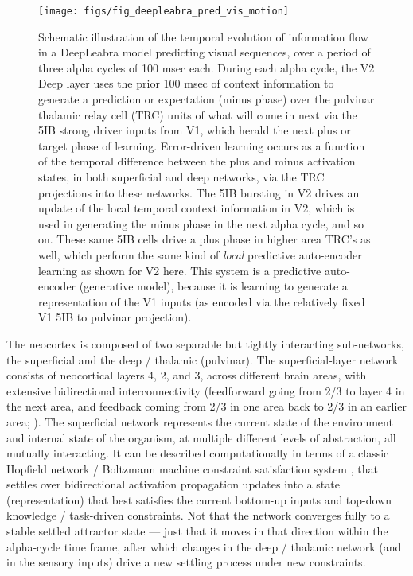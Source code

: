 \documentclass[11pt,twoside]{article}
\newif\myifpdf
\begin{document}
\begin{figure}
  \centering\texttt{[image: figs/fig\_deepleabra\_pred\_vis\_motion]}
  \caption{\footnotesize Schematic illustration of the temporal evolution of information flow in a DeepLeabra model predicting visual sequences, over a period of three alpha cycles of 100 msec each.  During each alpha cycle, the V2 Deep layer uses the prior 100 msec of context information to generate a prediction or expectation (minus phase) over the pulvinar thalamic relay cell (TRC) units of what will come in next via the 5IB strong driver inputs from V1, which herald the next plus or target phase of learning.  Error-driven learning occurs as a function of the temporal difference between the plus and minus activation states, in both superficial and deep networks, via the TRC projections into these networks.  The 5IB bursting in V2 drives an update of the local temporal context information in V2, which is used in generating the minus phase in the next alpha cycle, and so on.  These same 5IB cells drive a plus phase in higher area TRC's as well, which perform the same kind of {\em local} predictive auto-encoder learning as shown for V2 here.  This system is a predictive auto-encoder (generative model), because it is learning to generate a representation of the V1 inputs (as encoded via the relatively fixed V1 5IB to pulvinar projection).}
  \label{fig.pred_vis_motion}
\end{figure}


The neocortex is composed of two separable but tightly interacting sub-networks, the superficial and the deep / thalamic (pulvinar).  The superficial-layer network consists of neocortical layers 4, 2, and 3, across different brain areas, with extensive bidirectional interconnectivity (feedforward going from 2/3 to layer 4 in the next area, and feedback coming from 2/3 in one area back to 2/3 in an earlier area; ). The superficial network represents the current state of the environment and internal state of the organism, at multiple different levels of abstraction, all mutually interacting.  It can be described computationally in terms of a classic Hopfield network / Boltzmann machine constraint satisfaction system \cite{Hopfield82,Hopfield84,AckleyHintonSejnowski85,RumelhartMcClelland82}, that settles over bidirectional activation propagation updates into a state (representation) that best satisfies the current bottom-up inputs and top-down knowledge / task-driven constraints. Not that the network converges fully to a stable settled attractor state --- just that it moves in that direction within the alpha-cycle time frame, after which changes in the deep / thalamic network (and in the sensory inputs) drive a new settling process under new constraints.
\end{document}
